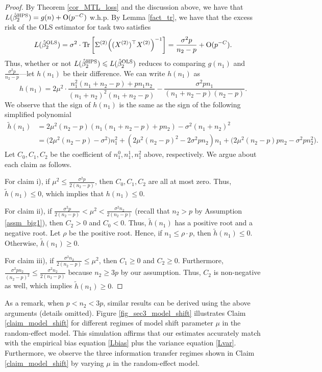 \begin{proof}
By Theorem \ref{cor_MTL_loss} and the discussion above, we have that $L(\hat{\beta}_2^{\textup{HPS}}) = g(n) + \operatorname{O}(p^{-C})$ w.h.p.
By Lemma \ref{fact_tr}, we have that the excess risk of the OLS estimator for task two satisfies
\begin{align*}
    L(\hat{\beta}_2^{\STL})
    = \sigma^2 \cdot \bigtr{\Sigma^{(2)}\Big((X^{(2)})^{\top} X^{(2)} \Big)^{-1}}
    = \frac{\sigma^2 p}{n_2 - p} + \OO(p^{-C}).
\end{align*}
Thus, whether or not $L(\hat{\beta}_2^{\textup{HPS}}) \leqslant L(\hat{\beta}_2^{\textup{OLS}})$ reduces to comparing $g(n_1)$ and $\frac{\sigma^2 p}{n_2 - p}$---let $h(n_1)$ be their difference.
We can write $h(n_1)$ as
\[ h(n_1) = 2\mu^2 \cdot \frac{n_1^2 (n_1 + n_2 - p) + p n_1 n_2}{(n_1 + n_2)^2 (n_1 + n_2 - p)} - \frac{\sigma^2 p n_1}{(n_1 + n_2 - p)(n_2 - p)}. \]
We observe that the sign of $h(n_1)$ is the same as the sign of the following simplified polynomial
\begin{align*}
    \tilde h(n_1) &= 2\mu^2 (n_2 - p) (n_1 (n_1 + n_2 - p) + p n_2) - \sigma^2 (n_1 + n_2)^2 \\
    &= \big(2\mu^2 (n_2 - p) - \sigma^2\big) n_1^2 + (2\mu^2 (n_2 - p)^2 - 2\sigma^2 p n_2) n_1 + \big(2\mu^2 (n_2 - p) p n_2 - \sigma^2 p n_2^2\big).
\end{align*}
Let $C_0, C_1, C_2$ be the coefficient of $n_1^0, n_1^1, n_1^2$ above, respectively.
We argue about each claim as follows.

For claim i), if $\mu^2 \le \frac{\sigma^2 p}{2(n_2 - p)}$, then $C_0, C_1, C_2$ are all at most zero.
Thus, $\tilde h(n_1) \le 0$, which implies that $h(n_1) \le 0$.

For claim ii), if $\frac{\sigma^2 p}{2(n_2 - p)}< \mu^2 < \frac{\sigma^2 n_2}{2(n_2 - p)}$ (recall that $n_2 > p$ by Assumption \ref{assm_big1}), then $C_2 > 0$ and $C_0 < 0$.
Thus, $\tilde{h}(n_1)$ has a positive root and a negative root.
Let $\rho$ be the positive root.
Hence, if $n_1 \le \rho \cdot p$, then $\tilde h(n_1) \le 0$.
Otherwise, $\tilde h(n_1) \ge 0$.

For claim iii), if $\frac{\sigma^2 n_2}{2(n_2 - p)} \le \mu^2$, then $C_1 \ge 0$ and $C_2 \ge 0$.
Furthermore, $\frac{\sigma^2 p n_2}{(n_2 - p)^2} \le \frac{\sigma^2 n_2}{2(n_2 - p)}$ because $n_2 \ge 3p$ by our assumption.
Thus, $C_2$ is non-negative as well, which implies $\tilde h(n_1) \ge 0$.
\end{proof}

As a remark, when $p < n_2 < 3p$, similar results can be derived using the above arguments (details omitted).
Figure \ref{fig_sec3_model_shift} illustrates Claim \ref{claim_model_shift} for different regimes of model shift parameter $\mu$ in the random-effect model.
This simulation affirms that our estimates accurately match with the empirical bias equation \eqref{Lbias} plus the variance equation \eqref{Lvar}.
Furthermore, we observe the three information transfer regimes shown in Claim \ref{claim_model_shift} by varying $\mu$ in the random-effect model.





